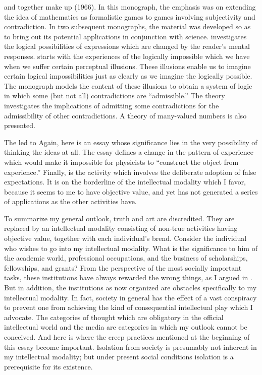 {\sloppy {} and  together make up  (1966). In 
this monograph, the emphasis was on extending the idea of mathematics as 
formalistic games to games involving subjectivity and contradiction. In two 
subsequent monographs, the material was developed so as to bring out its 
potential applications in conjunction with science. 
 investigates the logical 
possibilities of expressions which are changed by the reader's mental responses.
 starts with the experiences 
of the logically impossible which 
we have when we suffer certain perceptual illusions. These illusions enable us 
to imagine certain logical impossibilities just as clearly as we imagine the 
logically possible. The monograph models the content of these illusions to 
obtain a system of logic in which some (but not all) contradictions are 
\enquote{admissible.} The theory investigates the implications of admitting some 
contradictions for the admissibility of other contradictions. A theory of 
many-valued numbers is also presented. \par}

The  led to 
 Again, here is an essay whose 
significance lies in the very possibility of thinking the ideas at all. The essay 
defines a change in the pattern of experience which would make it 
impossible for physicists to \enquote{construct the object from experience.} Finally, 
 is the activity which involves the deliberate adoption of 
false expectations. It is on the borderline of the intellectual modality which I 
favor, because it seems to me to have objective value, and yet has not 
generated a series of applications as the other activities have. 

To summarize my general outlook, truth and art are discredited. They 
are replaced by an intellectual modality consisting of non-true activities 
having objective value, together with each individual's brend. Consider the 
individual who wishes to go into my intellectual modality. What is the 
significance to him of the academic world, professional occupations, and the 
business of scholarships, fellowships, and grants? From the perspective of 
the most socially important tasks, these institutions have always rewarded 
the wrong things, as I argued in . But in addition, the 
institutions as now organized are obstacles specifically to my intellectual 
modality. In fact, society in general has the effect of a vast conspiracy to 
prevent one from achieving the kind of consequential intellectual play which 
I advocate. The categories of thought which are obligatory in the official
intellectual world and the media are categories in which my outlook cannot 
be conceived. And here is where the creep practices mentioned at the 
beginning of this essay become important. Isolation from society is 
presumably not inherent in my intellectual modality; but under present 
social conditions isolation is a prerequisite for its existence. 


